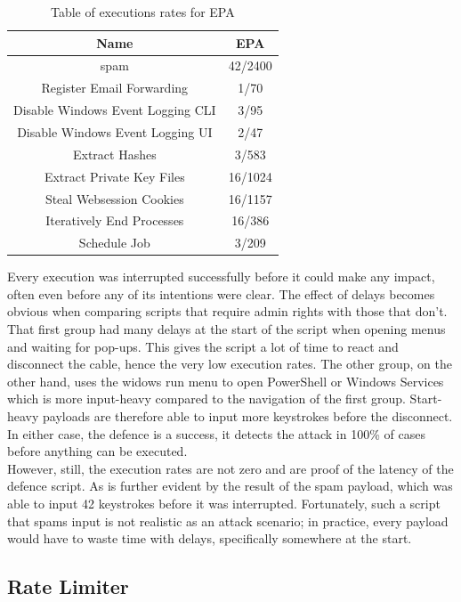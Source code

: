 \begin{table}[h]
\centering
\begin{tabular}{|c|c|}
\hline
Name & EPA  \\
\hline
spam & 42/2400 \\
\hline
Register Email Forwarding & 1/70  \\
\hline
Disable Windows Event Logging CLI &  3/95 \\
\hline
Disable Windows Event Logging UI & 2/47 \\
\hline
Extract Hashes & 3/583  \\
\hline
Extract Private Key Files & 16/1024 \\
\hline
Steal Websession Cookies & 16/1157 \\
\hline
Iteratively End Processes & 16/386 \\
\hline
Schedule Job & 3/209 \\
\hline
\end{tabular}
\caption{Table of executions rates for EPA}
\label{table:EPA_results}
\end{table}

Every execution was interrupted successfully before it could make any impact, often even before any of its intentions were clear. The effect of delays becomes obvious when comparing scripts that require admin rights with those that don't. That first group had many delays at the start of the script when opening menus and waiting for pop-ups. This gives the script a lot of time to react and disconnect the cable, hence the very low execution rates. The other group, on the other hand, uses the widows run menu to open PowerShell or Windows Services which is more input-heavy compared to the navigation of the first group. Start-heavy payloads are therefore able to input more keystrokes before the disconnect. In either case, the defence is a success, it detects the attack in 100\% of cases before anything can be executed. \\
However, still, the execution rates are not zero and are proof of the latency of the defence script. As is further evident by the result of the spam payload, which was able to input 42 keystrokes before it was interrupted.  Fortunately, such a script that spams input is not realistic as an attack scenario; in practice, every payload would have to waste time with delays, specifically somewhere at the start. 


\subsection{Rate Limiter}

